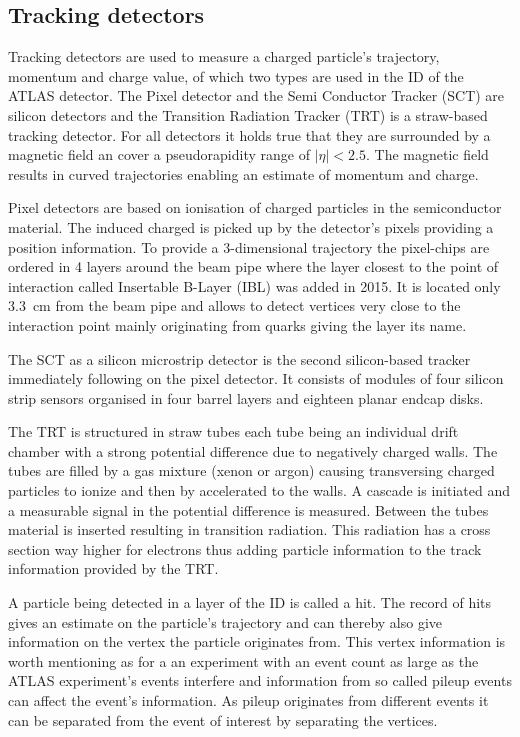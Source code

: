 \subsection{Tracking detectors}

Tracking detectors are used to measure a charged particle's trajectory, momentum and charge value, of which two types are used in the ID of the ATLAS detector. The Pixel detector and the Semi Conductor Tracker (SCT) are silicon detectors and the Transition Radiation Tracker (TRT) is a straw-based tracking detector. For all detectors it holds true that they are surrounded by a magnetic field an cover a pseudorapidity range of $|\eta| < 2.5$. The magnetic field results in curved trajectories enabling an estimate of momentum and charge.\cite{leo}

Pixel detectors are based on ionisation of charged particles in the semiconductor material. The induced charged is picked up by the detector's pixels providing a position information. To provide a 3-dimensional trajectory the pixel-chips are ordered in 4 layers around the beam pipe where the layer closest to the point of interaction called Insertable B-Layer (IBL) was added in 2015. It is located only \SI{3.3}{\centi \metre} from the beam pipe and allows to detect vertices very close to the interaction point mainly originating from \Pbottom quarks giving the layer its name.~\cite{pixel_run2}

The SCT as a silicon microstrip detector is the second silicon-based tracker immediately following on the pixel detector. It consists of modules of four silicon strip sensors organised in four barrel layers and eighteen planar endcap disks.

The TRT is structured in straw tubes each tube being an individual drift chamber with a strong potential difference due to negatively charged walls. The tubes are filled by a gas mixture (xenon or argon) causing transversing charged particles to ionize and then by accelerated to the walls. A cascade is initiated and a measurable signal in the potential difference is measured. 
Between the tubes material is inserted resulting in transition radiation. This radiation has a cross section way higher for electrons thus adding particle information to the track information provided by the TRT.

A particle being detected in a layer of the ID is called a hit. The record of hits gives an estimate on the particle's trajectory and can thereby also give information on the vertex the particle originates from. This vertex information is worth mentioning as for a an experiment with an event count as large as the ATLAS experiment's events interfere and information from so called pileup events can affect the event's information. As pileup originates from different events it can be separated from the event of interest by separating the vertices.

